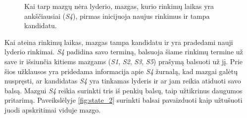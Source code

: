 \documentclass{VUMIFPSkursinis}
\begin{document}
\begin{figure}[H]
\centering

    \hfill
    \caption{Kai tarp mazgų nėra lyderio, mazgas, kurio rinkimų laikas yra ankščiausiai (\textit{S4}), pirmas inicijuoja naujus rinkimus ir tampa kandidatu.}
\end{figure}

Kai ateina rinkimų laikas, mazgas tampa kandidatu ir yra pradedami nauji lyderio rinkimai. \textit{S4} padidina savo terminą, balsuoja šiame rinkimų termine už save ir išsiunčia kitiems mazgams (\textit{S1}, \textit{S2}, \textit{S3}, \textit{S5}) prašymą balsuoti už jį. Prie šios užklausos yra pridedama informacija apie \textit{S4} žurnalą, kad mazgai galėtų nuspręsti, ar kandidatas \textit{S4} yra tinkamas lyderis ir ar jam reikia atiduoti savo balsą. Mazgui \textit{S4} reikia surinkti tris iš penkių balsų, taip užtikrinus daugumos pritarimą. Paveikslėlyje \ref{fig:state_2} surinkti balsai pavaizduoti kaip užtušuoti juodi apskritimai viduje mazgo.
\end{document}
